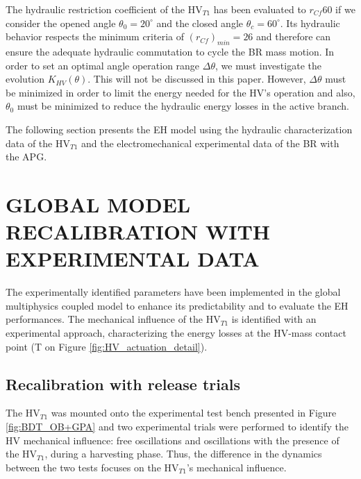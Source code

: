 \documentclass[3p,twocolumn,preprint]{elsarticle}
\begin{document}
The hydraulic restriction coefficient of the HV$_{T1}$ has been evaluated to $r_{Cf}60$ if we consider the opened angle $\theta_0=20^{\circ}$ and the closed angle $\theta_c = 60^{\circ}$. Its hydraulic behavior respects the minimum criteria of \mbox{$(r_{Cf})_{min}=26$} and therefore can ensure the adequate hydraulic commutation to cycle the BR mass motion. In order to set an optimal angle operation range $\Delta\theta$, we must investigate the evolution $K_{HV}(\theta)$. This will not be discussed in this paper. However, $\Delta\theta$ must be minimized in order to limit the energy needed for the HV's operation and also, $\theta_0$ must be minimized to reduce the hydraulic energy losses in the active branch.

The following section presents the EH model using the hydraulic characterization data of the HV$_{T1}$ and the electromechanical experimental data of the BR with the APG.

\section{GLOBAL MODEL RECALIBRATION WITH \mbox{EXPERIMENTAL} DATA}
\label{sec:MODEL RECALIBRATION WITH EXPERIMENTAL DATA}
The experimentally identified parameters have been implemented in the global multiphysics coupled model to enhance its predictability and to evaluate the EH performances. The mechanical influence of the HV$_{T1}$ is identified with an experimental approach, characterizing the energy losses at the HV-mass contact point (T on Figure \ref{fig:HV_actuation_detail}). 
	\subsection{Recalibration with release trials}
The HV$_{T1}$ was mounted onto the experimental test bench presented in Figure \ref{fig:BDT_OB+GPA} and two experimental trials were performed to identify the HV mechanical influence: free oscillations and oscillations with the presence of the HV$_{T1}$, during a harvesting phase. Thus, the difference in the dynamics between the two tests focuses on the HV$_{T1}$'s mechanical influence. 
\end{document}
